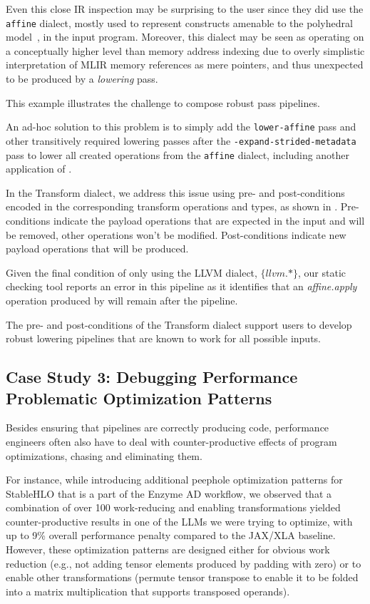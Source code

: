 \documentclass[screen,nonacm,authorversion]{acmart}
\begin{document}
Even this close IR inspection may be surprising to the user since they did use the \texttt{affine} dialect, mostly used to represent constructs amenable to the polyhedral model~\cite{polyhedral,affine}, in the input program. Moreover, this dialect may be seen as operating on a conceptually higher level than memory address indexing due to overly simplistic interpretation of MLIR memory references as mere pointers, and thus unexpected to be produced by a \emph{lowering} pass.


This example illustrates the challenge to compose robust pass pipelines.


An ad-hoc solution to this problem is to simply add the \texttt{lower-affine} pass and other transitively required lowering passes after the \texttt{-expand-strided-metadata} pass to lower all created operations from the \texttt{affine} dialect, including another application of .






In the Transform dialect, we address this issue using pre- and post-conditions encoded in the corresponding transform operations and types, as shown in .
Pre-conditions indicate the payload operations that are expected in the input and will be removed, other operations won't be modified. Post-conditions indicate new payload operations that will be produced.

Given the final condition of only using the LLVM dialect, $\{llvm.*\}$, our static checking tool reports an error in this pipeline as it identifies that an \emph{affine.apply} operation produced by  will remain after the pipeline.



The pre- and post-conditions of the Transform dialect support users to develop robust lowering pipelines that are known to work for all possible inputs.






\subsection{Case Study 3: Debugging Performance Problematic Optimization Patterns}
Besides ensuring that pipelines are correctly producing code, performance engineers often also have to deal with counter-productive effects of program optimizations, chasing and eliminating them.

For instance, while introducing additional peephole optimization patterns for StableHLO that is a part of the Enzyme AD workflow, we observed that a combination of over 100 work-reducing and enabling transformations yielded counter-productive results in one of the LLMs we were trying to optimize, with up to 9\% overall performance penalty compared to the JAX/XLA baseline. However, these optimization patterns are designed either for obvious work reduction (e.g., not adding tensor elements produced by padding with zero) or to enable other transformations (permute tensor transpose to enable it to be folded into a matrix multiplication that supports transposed operands).
\end{document}

